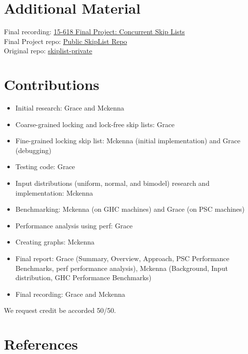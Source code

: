 \documentclass[11pt]{article}
\begin{document}

\pagebreak
\section{Additional Material}
Final recording: \href{https://www.youtube.com/watch?v=E-VfOaCNW-0}{15-618 Final Project: Concurrent Skip Lists} \\
Final Project repo: \href{https://github.com/gean2/parallel-cnn}{Public SkipList Repo} \\
Original repo: \href{https://github.com/gean2/skiplist-private}{skiplist-private}

\section{Contributions}
\begin{itemize}
    \item Initial research: Grace and Mckenna
    \item Coarse-grained locking and lock-free skip lists: Grace
    \item Fine-grained locking skip list: Mckenna (initial implementation) and Grace (debugging)
    \item Testing code: Grace
    \item Input distributions (uniform, normal, and bimodel) research and implementation: Mckenna
    \item Benchmarking: Mckenna (on GHC machines) and Grace (on PSC machines) 
    \item Performance analysis using perf: Grace
    \item Creating graphs: Mckenna
    \item Final report: Grace (Summary, Overview, Approach, PSC Performance Benchmarks, perf performance analysis), Mckenna (Background, Input distribution, GHC Performance Benchmarks)
    \item Final recording: Grace and Mckenna
\end{itemize}
We request credit be accorded 50/50.
\section{References}


\end{document}

